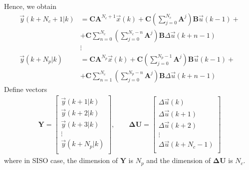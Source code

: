 \documentclass[12pt,a4paper,oneside]{book}
\begin{document}
\begin{onehalfspace}
Hence, we obtain
\begin{equation}\label{eq13}
	\begin{aligned}
		\vec{y}(k+N_c+1|k) &= \mathbf{C}\mathbf{A}^{N_c+1}\vec{x}(k) 
		+\mathbf{C}\left(\sum_{j=0}^{N_c}\mathbf{A}^j\right)\mathbf{B}\vec{u}(k-1)+
		 \\[6pt] 
		&+\mathbf{C}\sum_{n=0}^{N_c}\left(\sum_{j=0}^{N_c-n}\mathbf{A}^j\right)\mathbf{B}\Delta\vec{u}(k+n-1)
		 \\[6pt]
		&\vdots \\[6pt]
		\vec{y}(k+N_p|k) &= \mathbf{C}\mathbf{A}^{N_p}\vec{x}(k) 
		+\mathbf{C}\left(\sum_{j=0}^{N_p-1}\mathbf{A}^j\right)\mathbf{B}\vec{u}(k-1)+
		 \\[6pt] 
		&+\mathbf{C}\sum_{n=1}^{N_c}\left(\sum_{j=0}^{N_p-n}\mathbf{A}^j\right)\mathbf{B}\Delta\vec{u}(k+n-1)
	\end{aligned}
\end{equation}
Define vectors
\begin{equation}\label{eq14}
	\begin{aligned}
		\mathbf{Y}= \begin{bmatrix}
			\vec{y}(k+1|k) \\[6pt]
			\vec{y}(k+2|k) \\[6pt]
			\vec{y}(k+3|k) \\[6pt]
			\vdots \\[6pt]
			\vec{y}(k+N_p|k) \\[6pt]
		\end{bmatrix}, \qquad
		\mathbf{\Delta U}= \begin{bmatrix}
			\Delta\vec{u}(k) \\[6pt]
			\Delta\vec{u}(k+1) \\[6pt]
			\Delta\vec{u}(k+2) \\[6pt]
			\vdots \\[6pt]
			\Delta\vec{u}(k+N_c-1) \\[6pt]
		\end{bmatrix}
	\end{aligned}
\end{equation}
where in SISO case, the dimension of $\mathbf{Y}$ is $N_p$ and the dimension of 
$\mathbf{\Delta U}$ is $N_c$. \\


\end{onehalfspace}
\end{document}
